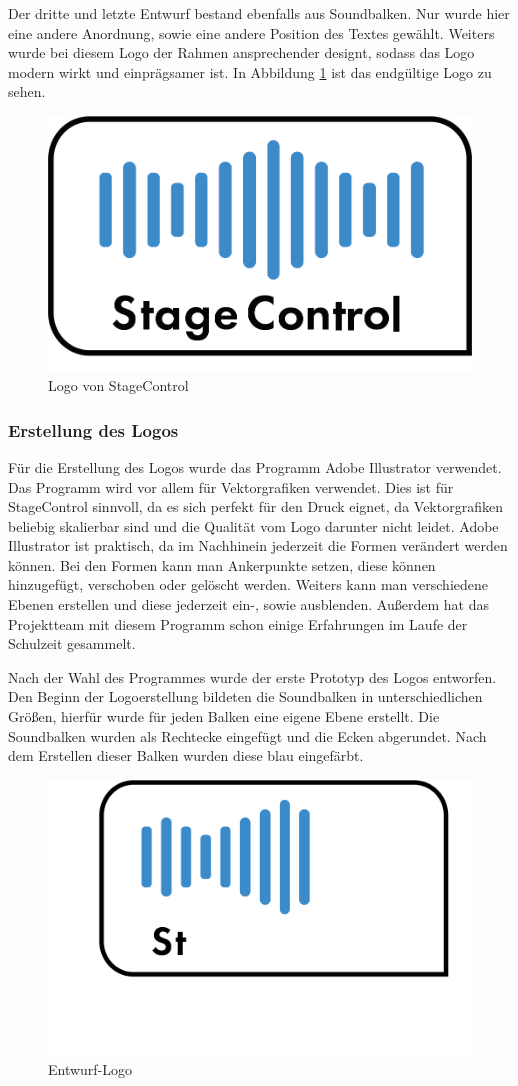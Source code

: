 Der dritte und letzte Entwurf bestand ebenfalls aus Soundbalken. Nur wurde hier eine andere Anordnung, sowie eine andere Position des Textes gewählt. Weiters wurde bei diesem Logo der Rahmen ansprechender designt, sodass das Logo modern wirkt und einprägsamer ist. In Abbildung \ref{fig:Logo StageControl} ist das endgültige Logo zu sehen.

\begin{figure}[H]
	\centering
	\includegraphics[width=0.5\linewidth]{images/Logo StageControl.png}
	\caption[Logo von StageControl]{Logo von StageControl}
	\label{fig:Logo StageControl}
\end{figure}

\newpage
\subsubsection{Erstellung des Logos}
Für die Erstellung des Logos wurde das Programm Adobe Illustrator verwendet. Das Programm wird vor allem für Vektorgrafiken verwendet. Dies ist für StageControl sinnvoll, da es sich perfekt für den Druck eignet, da Vektorgrafiken beliebig skalierbar sind und die Qualität vom Logo darunter nicht leidet. Adobe Illustrator ist praktisch, da im Nachhinein jederzeit die Formen verändert werden können. Bei den Formen kann man Ankerpunkte setzen, diese können hinzugefügt, verschoben oder gelöscht werden. Weiters kann man verschiedene Ebenen erstellen und diese jederzeit ein-, sowie ausblenden. Außerdem hat das Projektteam mit diesem Programm schon einige Erfahrungen im Laufe der Schulzeit gesammelt. 

Nach der Wahl des Programmes wurde der erste Prototyp des Logos entworfen. Den Beginn der Logoerstellung bildeten die Soundbalken in unterschiedlichen Größen, hierfür wurde für jeden Balken eine eigene Ebene erstellt. Die Soundbalken wurden als Rechtecke eingefügt und die Ecken abgerundet. Nach dem Erstellen dieser Balken wurden diese blau eingefärbt. 

\begin{figure}[H]
	\centering
	\includegraphics[width=0.5\linewidth]{images/Logo-Entwurf2.png}
	\caption[Entwurf-Logo]{Entwurf-Logo}
	\label{fig:Entwurf-Logo}
\end{figure}

